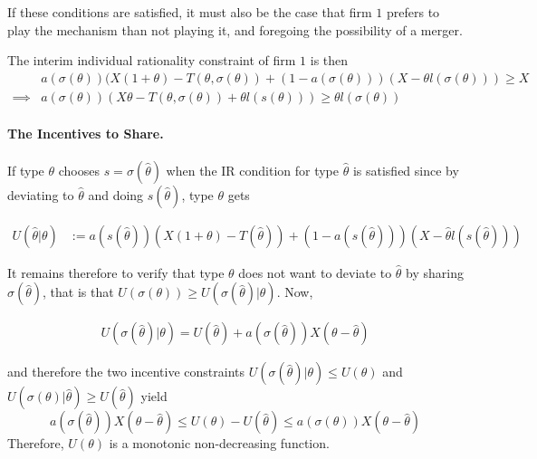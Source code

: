 \documentclass[a4paper]{article}
\renewcommand{\th}{\hat\theta}
\renewcommand{\t}{\theta}
\newcommand{\s}{\sigma}
\begin{document}
If these conditions are satisfied, it must also be the case that firm $1$ prefers to play the mechanism than not playing it, and foregoing the possibility of a merger. 

The interim individual rationality constraint of firm $1$ is then
\begin{equation}\label{cond:IR}
    \begin{aligned}
    &a(\s(\t))(X (1+\t)- T(\t,\s(\t))+(1-a(\s(\t)))(X-\t l(\s(\t)))\geq X  \\
    \implies &a(\s(\t))(X \t- T(\t,\s(\t))+\t l(s(\t)))\geq \t l(\s(\t))
    \end{aligned}
\end{equation}

\paragraph{The Incentives to Share.}




If type $\t$ chooses $s=\s(\th)$ when the IR condition for type $\th$ is satisfied since by deviating to $\th$ and doing $s(\th)$, type $\t$ gets

  \begin{align*}
    U(\th|\t)&:=a(s(\th))(X(1+\t)-T(\th))+(1-a(s(\th)))(X-\th l(s(\th)))
  \end{align*}

It remains therefore to verify that type $\t$ does not want to deviate to $\th$ by sharing $\s(\th)$, that is that $U(\s(\t))\geq U(\s(\th)|\t)$. Now,

\begin{align*}
U(\s(\th)|\t)=U(\th)+a(\s(\th))X(\t-\th)
\end{align*}

and therefore the two incentive constraints $U(\s(\th)|\t)\leq U(\t)$ and $U(\s(\t)|\th)\geq U(\th)$ yield
\[
a(\s(\th))X(\t-\th)\leq U(\t)-U(\th)\leq a(\s(\t))X(\t-\th)
\]
Therefore, $U(\t)$ is a monotonic non-decreasing function.
\end{document}
